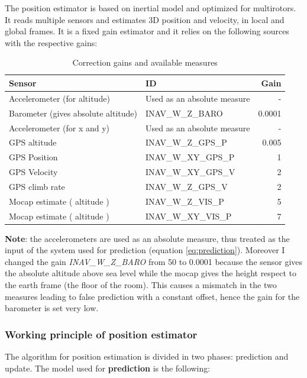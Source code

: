 The position estimator is based on inertial model and optimized for multirotors. It reads multiple sensors and estimates 3D position and velocity, in local and global frames. It is a fixed gain estimator and it relies on the following sources with the respective gains:
\begin{table}[H]
		\centering
	\begin{tabular}{l l r}
		\textbf{Sensor} & \textbf{ID} & \textbf{Gain} \\ \hline
		Accelerometer (for altitude) & Used as an absolute measure & - \\
		Barometer (gives absolute altitude)  & INAV\_W\_Z\_BARO & 0.0001  \\
		Accelerometer (for x and y) & Used as an absolute measure & - \\
		GPS altitude & INAV\_W\_Z\_GPS\_P & 0.005 \\
		GPS Position & INAV\_W\_XY\_GPS\_P & 1 \\
		GPS Velocity & INAV\_W\_XY\_GPS\_V & 2 \\
	    GPS climb rate & INAV\_W\_Z\_GPS\_V & 2 \\	
		Mocap estimate ( altitude ) & INAV\_W\_Z\_VIS\_P & 5 \\
		Mocap estimate ( altitude ) & INAV\_W\_XY\_VIS\_P & 7 \\
	\end{tabular}
	\caption{Correction gains and available measures}
	\label{tab:corrgain}
\end{table}
\noindent
\textbf{Note}: the accelerometers are used as an absolute measure, thus treated as the input of the system used for prediction (equation \eqref{eq:prediction}). Moreover I changed the gain \textit{INAV\_W\_Z\_BARO} from 50 to 0.0001 because the sensor gives the absolute altitude above sea level while the mocap gives the height respect to the earth frame (the floor of the room). This causes a mismatch in the two measures leading to false prediction with a constant offset, hence the gain for the barometer is set very low.

\subsubsection*{Working principle of position estimator}
The algorithm for position estimation is divided in two phases: prediction and update. The model used for \textbf{prediction} is the following: 

